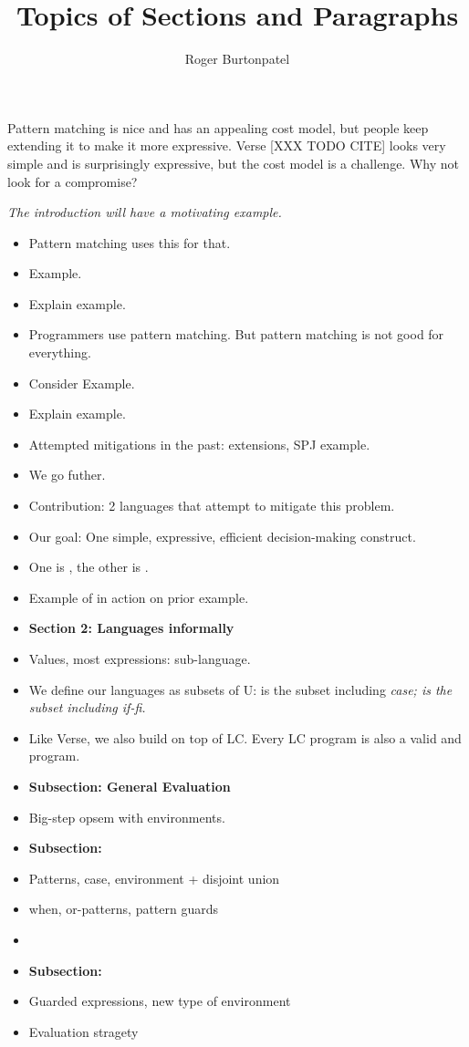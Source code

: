 \documentclass{article}
\title{Topics of Sections and Paragraphs}
\author{Roger Burtonpatel}
\begin{document}
\maketitle

Pattern matching is nice and has an appealing cost model, but people keep
extending it to make it more expressive. Verse [XXX TODO CITE] looks very simple
and is surprisingly expressive, but the cost model is a challenge. Why not look
for a compromise?

\bigskip 
\it{The introduction will have a motivating example.}
\bigskip 

\begin{itemize}
    \item Pattern matching uses this for that. 
    \item Example. 
    \item Explain example. 
    \item Programmers use pattern matching. But pattern matching is not good for
    everything. 
    \item Consider Example. 
    \item Explain example. 
    \item Attempted mitigations in the past: extensions, SPJ example. 
    \item We go futher. 
    \item Contribution: 2 languages that attempt to mitigate this problem. 
    \item Our goal: One simple, expressive, efficient decision-making construct.
    \item One is \PPlus, the other is \VMinus. 
    \item Example of \VMinus in action on prior example. 
    \item \bf{Section 2: Languages informally}
    \item Values, most expressions: sub-language. 
    \item We define our languages as subsets of U: \PPlus is the subset 
    including \it{case}; \VMinus is the subset including \it{if-fi}. 
    \item Like Verse, we also build on top of LC. Every LC program is also a
    valid \PPlus and \VMinus program.
    \item \bf{Subsection: General Evaluation}
    \item Big-step opsem with environments. 
    \item \bf{Subsection: \PPlus}
    \item Patterns, case, environment + disjoint union 
    \item when, or-patterns, pattern guards 
    \item
    \item \bf{Subsection: \VMinus}
    \item Guarded expressions, new type of environment
    \item Evaluation stragety 
\end{itemize}
\end{document}
